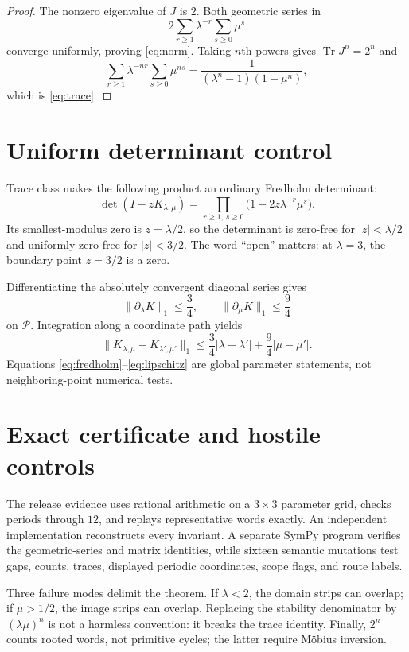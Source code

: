 \documentclass[11pt]{article}
\newcommand{\Tr}{\operatorname{Tr}}
\begin{document}
\begin{proof}
The nonzero eigenvalue of $J$ is $2$.  Both geometric series in
\[
 2\sum_{r\ge1}\lambda^{-r}\sum_{s\ge0}\mu^s
\]
converge uniformly, proving \eqref{eq:norm}.  Taking $n$th powers gives
$\Tr J^n=2^n$ and
\[
 \sum_{r\ge1}\lambda^{-nr}\sum_{s\ge0}\mu^{ns}
 =\frac1{(\lambda^n-1)(1-\mu^n)},
\]
which is \eqref{eq:trace}.
\end{proof}

\section{Uniform determinant control}

Trace class makes the following product an ordinary Fredholm determinant:
\begin{equation}\label{eq:fredholm}
 \det(I-zK_{\lambda,\mu})
 =\prod_{r\ge1,\,s\ge0}
   \bigl(1-2z\lambda^{-r}\mu^s\bigr).
\end{equation}
Its smallest-modulus zero is $z=\lambda/2$, so the determinant is zero-free
for $|z|<\lambda/2$ and uniformly zero-free for $|z|<3/2$.  The word
``open'' matters: at $\lambda=3$, the boundary point $z=3/2$ is a zero.

Differentiating the absolutely convergent diagonal series gives
\[
 \|\partial_\lambda K\|_1\le\frac34,
 \qquad
 \|\partial_\mu K\|_1\le\frac94
\]
on $\mathcal P$.  Integration along a coordinate path yields
\begin{equation}\label{eq:lipschitz}
 \|K_{\lambda,\mu}-K_{\lambda',\mu'}\|_1
 \le\frac34|\lambda-\lambda'|+
      \frac94|\mu-\mu'|.
\end{equation}
Equations \eqref{eq:fredholm}--\eqref{eq:lipschitz} are global parameter
statements, not neighboring-point numerical tests.

\section{Exact certificate and hostile controls}

The release evidence uses rational arithmetic on a $3\times3$ parameter grid,
checks periods through $12$, and replays representative words exactly.  An
independent implementation reconstructs every invariant.  A separate SymPy
program verifies the geometric-series and matrix identities, while sixteen
semantic mutations test gaps, counts, traces, displayed periodic coordinates,
scope flags, and route labels.

Three failure modes delimit the theorem.  If $\lambda<2$, the domain strips
can overlap; if $\mu>1/2$, the image strips can overlap.  Replacing the
stability denominator by $(\lambda\mu)^n$ is not a harmless convention: it
breaks the trace identity.  Finally, $2^n$ counts rooted words, not primitive
cycles; the latter require M\"obius inversion.
\end{document}
